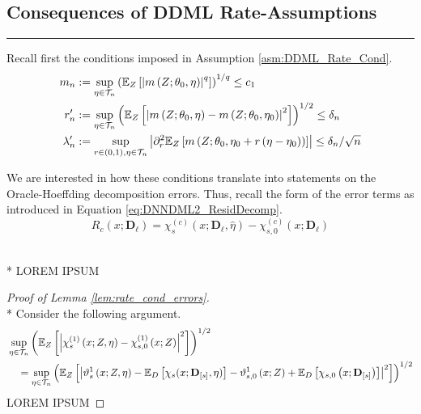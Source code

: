 \subsection{Consequences of DDML Rate-Assumptions}
\hrule

Recall first the conditions imposed in Assumption \ref{asm:DDML_Rate_Cond}.
\begin{align}
    m_{n} 
    & :=\sup_{\eta \in \mathcal{T}_{n}}\left(\mathbb{E}_{Z}\left[\left|m\left(Z; \theta_0, \eta\right)\right|^q\right]\right)^{1 / q}
    \leq c_1\\
    r_{n}^{\prime}
    & :=\sup_{\eta \in \mathcal{T}_{n}}\left(\mathbb{E}_{Z}\left[\left|m\left(Z; \theta_0, \eta\right)-m\left(Z; \theta_0, \eta_0\right)\right|^2\right]\right)^{1 / 2} 
    \leq \delta_{n}\\
    \lambda_{n}^{\prime}
    & :=\sup_{r \in(0,1), \eta \in \mathcal{T}_{n}}\left|\partial_r^2 \mathbb{E}_{Z}\left[m\left(Z; \theta_0, \eta_0+r\left(\eta-\eta_0\right)\right)\right]\right| 
    \leq \delta_{n} / \sqrt{n}
\end{align}

We are interested in how these conditions translate into statements on the Oracle-Hoeffding decomposition errors.
Thus, recall the form of the error terms as introduced in Equation \ref{eq:DNNDML2_ResidDecomp}.
\begin{equation}
    R_{c}\left(x; \mathbf{D}_{\ell}\right) 
    = \chi_{s}^{(c)}\left(x; \mathbf{D}_{\ell}, \hat{\eta}\right) - \chi_{s,0}^{(c)}\left(x; \mathbf{D}_{\ell}\right)
\end{equation}

\begin{lem}[]\label{lem:rate_cond_errors}\mbox{}\\*
    {\color{red} LOREM IPSUM}
\end{lem}

\begin{proof}[Proof of Lemma \ref{lem:rate_cond_errors}]\mbox{}\\*
    Consider the following argument.
    \begin{equation}
        \begin{aligned}
            & \sup_{\eta \in \mathcal{T}_{n}}\left(
                \mathbb{E}_{Z}\left[
                    \left|\chi_{s}^{(1)}\left(x; Z, \eta\right) 
                    - \chi_{s,0}^{(1)}\left(x; Z\right)\right|^2
                \right]
            \right)^{1 / 2} \\
            & \quad = \sup_{\eta \in \mathcal{T}_{n}}\left(
                \mathbb{E}_{Z}\left[\left|\vartheta_{s}^{1}\left(x; Z, \eta\right)
            - \mathbb{E}_{D}\left[\chi_{s}(x; \mathbf{D}_{[s]}, \eta)\right]
            - \vartheta_{s,0}^{1}\left(x; Z\right) 
            + \mathbb{E}_{D}\left[\chi_{s,0}\left(x; \mathbf{D}_{[s]}\right)\right]\right|^{2}\right]
            \right)^{1 / 2}
        \end{aligned}
    \end{equation}
    {\color{red} LOREM IPSUM}
\end{proof}